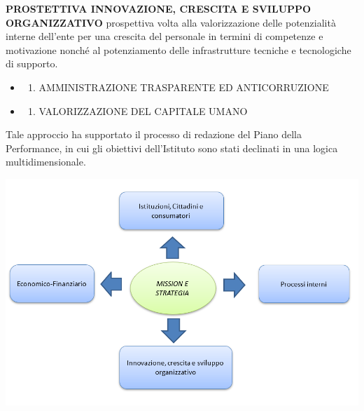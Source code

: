 \documentclass[
  12pt,
]{article}
\providecommand{\tightlist}{%
  \setlength{\itemsep}{0pt}\setlength{\parskip}{0pt}}
\begin{document}
\textbf{PROSTETTIVA INNOVAZIONE, CRESCITA E SVILUPPO ORGANIZZATIVO}
prospettiva volta alla valorizzazione delle potenzialità interne
dell'ente per una crescita del personale in termini di competenze e
motivazione nonché al potenziamento delle infrastrutture tecniche e
tecnologiche di supporto.

\begin{itemize}
\item
  \begin{enumerate}
  \def\labelenumi{\arabic{enumi}.}
  \setcounter{enumi}{4}
  \tightlist
  \item
    AMMINISTRAZIONE TRASPARENTE ED ANTICORRUZIONE
  \end{enumerate}
\item
  \begin{enumerate}
  \def\labelenumi{\arabic{enumi}.}
  \setcounter{enumi}{5}
  \tightlist
  \item
    VALORIZZAZIONE DEL CAPITALE UMANO
  \end{enumerate}
\end{itemize}

Tale approccio ha supportato il processo di redazione del Piano della
Performance, in cui gli obiettivi dell'Istituto sono stati declinati in
una logica multidimensionale.

\begin{center}\includegraphics[width=0.9\linewidth]{figure/f2} \end{center}
\end{document}
